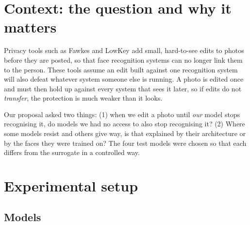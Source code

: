 \documentclass[10pt,a4paper]{article}
\begin{document}
\section{Context: the question and why it matters}

Privacy tools such as Fawkes and LowKey add small, hard-to-see edits to photos before they are posted, so that face recognition systems can no longer link them to the person. These tools assume an edit built against one recognition system will also defeat whatever system someone else is running. A photo is edited once and must then hold up against every system that sees it later, so if edits do not \emph{transfer}, the protection is much weaker than it looks.


Our proposal asked two things: (1) when we edit a photo until \emph{our} model stops recognising it, do models we had no access to also stop recognising it? (2) Where some models resist and others give way, is that explained by their architecture or by the faces they were trained on? The four test models were chosen so that each differs from the surrogate in a controlled way.


\section{Experimental setup}

\subsection{Models}
\end{document}

